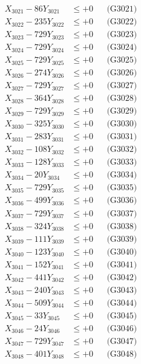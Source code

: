 \documentclass[a4paper,10pt]{article}
\begin{document}
{\begin{align}
\allowbreak
X_{3021} - 86Y_{3021} &\leq +0 && \text{(G3021)} \\
X_{3022} - 235Y_{3022} &\leq +0 && \text{(G3022)} \\
X_{3023} - 729Y_{3023} &\leq +0 && \text{(G3023)} \\
X_{3024} - 729Y_{3024} &\leq +0 && \text{(G3024)} \\
X_{3025} - 729Y_{3025} &\leq +0 && \text{(G3025)} \\
X_{3026} - 274Y_{3026} &\leq +0 && \text{(G3026)} \\
X_{3027} - 729Y_{3027} &\leq +0 && \text{(G3027)} \\
X_{3028} - 364Y_{3028} &\leq +0 && \text{(G3028)} \\
X_{3029} - 729Y_{3029} &\leq +0 && \text{(G3029)} \\
X_{3030} - 325Y_{3030} &\leq +0 && \text{(G3030)} \\
\allowbreak
X_{3031} - 283Y_{3031} &\leq +0 && \text{(G3031)} \\
X_{3032} - 108Y_{3032} &\leq +0 && \text{(G3032)} \\
X_{3033} - 128Y_{3033} &\leq +0 && \text{(G3033)} \\
X_{3034} - 20Y_{3034} &\leq +0 && \text{(G3034)} \\
X_{3035} - 729Y_{3035} &\leq +0 && \text{(G3035)} \\
X_{3036} - 499Y_{3036} &\leq +0 && \text{(G3036)} \\
X_{3037} - 729Y_{3037} &\leq +0 && \text{(G3037)} \\
X_{3038} - 324Y_{3038} &\leq +0 && \text{(G3038)} \\
X_{3039} - 111Y_{3039} &\leq +0 && \text{(G3039)} \\
X_{3040} - 123Y_{3040} &\leq +0 && \text{(G3040)} \\
\allowbreak
X_{3041} - 152Y_{3041} &\leq +0 && \text{(G3041)} \\
X_{3042} - 441Y_{3042} &\leq +0 && \text{(G3042)} \\
X_{3043} - 240Y_{3043} &\leq +0 && \text{(G3043)} \\
X_{3044} - 509Y_{3044} &\leq +0 && \text{(G3044)} \\
X_{3045} - 33Y_{3045} &\leq +0 && \text{(G3045)} \\
X_{3046} - 24Y_{3046} &\leq +0 && \text{(G3046)} \\
X_{3047} - 729Y_{3047} &\leq +0 && \text{(G3047)} \\
X_{3048} - 401Y_{3048} &\leq +0 && \text{(G3048)} \\

\end{align}}
\end{document}
